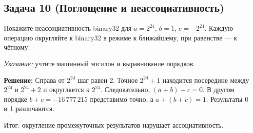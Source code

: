 \subsection*{Задача 10 (Поглощение и неассоциативность)}
Покажите неассоциативность binary32 для $a=2^{24}$, $b=1$,
$c=-2^{24}$. Каждую операцию округляйте к binary32 в режиме
к ближайшему, при равенстве --- к чётному.

\textit{Указание:} учтите машинный эпсилон и выравнивание порядков.

\textbf{Решение:}
Справа от $2^{24}$ шаг равен 2. Точное $2^{24}+1$ находится
посередине между $2^{24}$ и $2^{24}+2$ и округляется к $2^{24}$.
Следовательно, $(a+b)+c=0$.
В другом порядке $b+c=-16\,777\,215$ представимо точно,
а $a+(b+c)=1$. Результаты 0 и 1 различаются.

Итог: округление промежуточных результатов нарушает ассоциативность.
\par\endgroup
